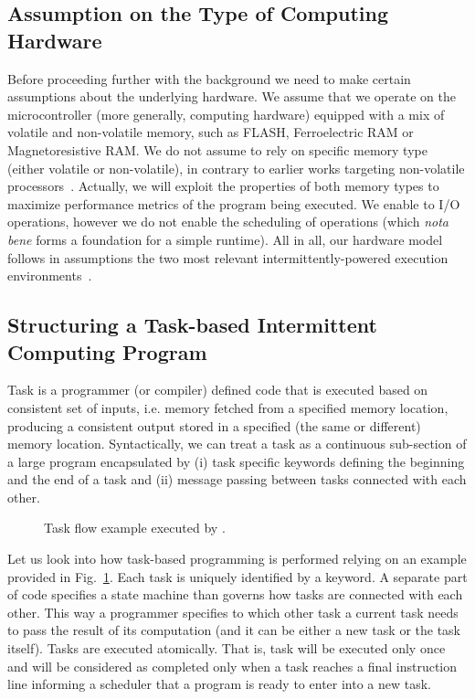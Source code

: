 \subsection{Assumption on the Type of Computing Hardware}
\label{sec:background_hardware}

Before proceeding further with the background we need to make certain assumptions about the underlying hardware. We assume that we operate on the microcontroller (more generally, computing hardware) equipped with a mix of volatile and non-volatile memory, such as FLASH, Ferroelectric RAM or Magnetoresistive RAM. We do not assume to rely on specific memory type (either volatile or non-volatile), in contrary to earlier works targeting non-volatile processors~\cite{su_date_2017,ratchet,quickrecall,nvp}. Actually, we will exploit the properties of both memory types to maximize performance metrics of the program being executed. We enable to I/O operations, however we do not enable the scheduling of operations (which \emph{nota bene} forms a foundation for a simple runtime). All in all, our hardware model follows in assumptions the two most relevant intermittently-powered execution environments~\cite{alpaca,chain}. 

\subsection{Structuring a Task-based Intermittent Computing Program}

 Task is a programmer (or compiler) defined code that is executed based on consistent set of inputs, i.e. memory fetched from a specified memory location, producing a consistent output stored in a specified (the same or different) memory location. Syntactically, we can treat a task as a continuous sub-section of a large program encapsulated by (i) task specific keywords defining the beginning and the end of a task and (ii) message passing between tasks connected with each other.

\begin{figure}
	\centering
	\caption{Task flow example executed by \sys.}
	\label{fig:task_flow_example}
\end{figure}

Let us look into how task-based programming is performed relying on an example provided in Fig.~\ref{fig:task_flow_example}. Each task is uniquely identified by a keyword. A separate part of code specifies a state machine than governs how tasks are connected with each other. This way a programmer specifies to which other task a current task needs to pass the result of its computation (and it can be either a new task or the task itself). Tasks are executed atomically. That is, task will be executed only once and will be considered as completed only when a task reaches a final instruction line informing a scheduler that a program is ready to enter into a new task.

